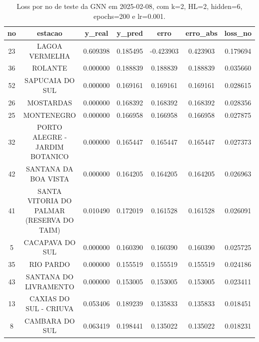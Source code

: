 \begin{table}[h]
\centering
\caption{Loss por no de teste da GNN em 2025-02-08, com k=2, HL=2, hidden=6, epochs=200 e lr=0.001.}
\label{tab:gnn_loss_k2_hl2_h6_e200_d20250208}
\begin{tabular}{ccccccc}
\toprule
no & estacao & y\_real & y\_pred & erro & erro\_abs & loss\_no \\
\midrule
23 & LAGOA VERMELHA & 0.609398 & 0.185495 & -0.423903 & 0.423903 & 0.179694 \\
36 & ROLANTE & 0.000000 & 0.188839 & 0.188839 & 0.188839 & 0.035660 \\
52 & SAPUCAIA DO SUL & 0.000000 & 0.169161 & 0.169161 & 0.169161 & 0.028615 \\
26 & MOSTARDAS & 0.000000 & 0.168392 & 0.168392 & 0.168392 & 0.028356 \\
25 & MONTENEGRO & 0.000000 & 0.166958 & 0.166958 & 0.166958 & 0.027875 \\
32 & PORTO ALEGRE - JARDIM BOTANICO & 0.000000 & 0.165447 & 0.165447 & 0.165447 & 0.027373 \\
42 & SANTANA DA BOA VISTA & 0.000000 & 0.164205 & 0.164205 & 0.164205 & 0.026963 \\
41 & SANTA VITORIA DO PALMAR (RESERVA DO TAIM) & 0.010490 & 0.172019 & 0.161528 & 0.161528 & 0.026091 \\
5 & CACAPAVA DO SUL & 0.000000 & 0.160390 & 0.160390 & 0.160390 & 0.025725 \\
35 & RIO PARDO & 0.000000 & 0.155519 & 0.155519 & 0.155519 & 0.024186 \\
43 & SANTANA DO LIVRAMENTO & 0.000000 & 0.153005 & 0.153005 & 0.153005 & 0.023411 \\
13 & CAXIAS DO SUL - CRIUVA & 0.053406 & 0.189239 & 0.135833 & 0.135833 & 0.018451 \\
8 & CAMBARA DO SUL & 0.063419 & 0.198441 & 0.135022 & 0.135022 & 0.018231 \\
\bottomrule
\end{tabular}
\end{table}
